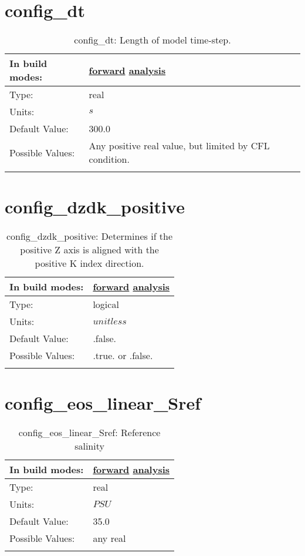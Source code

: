 \section[config\_dt]{config\_dt}
\label{sec:nm_sec_config_dt}
\begin{center}
\begin{longtable}{| p{2.0in} || p{4.0in} |}
    \hline
    In build modes: & \hyperref[subsec:forward_nm_tab_time_integration]{forward} \hyperref[subsec:analysis_nm_tab_time_integration]{analysis} \\
    \hline
    Type: & real \\
    \hline
    Units: & $s$ \\
    \hline
    Default Value: & 300.0 \\
    \hline
    Possible Values: & Any positive real value, but limited by CFL condition. \\
    \hline
    \caption{config\_dt: Length of model time-step.}
\end{longtable}
\end{center}
\section[config\_dzdk\_positive]{config\_dzdk\_positive}
\label{sec:nm_sec_config_dzdk_positive}
\begin{center}
\begin{longtable}{| p{2.0in} || p{4.0in} |}
    \hline
    In build modes: & \hyperref[subsec:forward_nm_tab_ALE_vertical_grid]{forward} \hyperref[subsec:analysis_nm_tab_ALE_vertical_grid]{analysis} \\
    \hline
    Type: & logical \\
    \hline
    Units: & $unitless$ \\
    \hline
    Default Value: & .false. \\
    \hline
    Possible Values: & .true. or .false. \\
    \hline
    \caption{config\_dzdk\_positive: Determines if the positive Z axis is aligned with the positive K index direction.}
\end{longtable}
\end{center}
\section[config\_eos\_linear\_Sref]{config\_eos\_linear\_Sref}
\label{sec:nm_sec_config_eos_linear_Sref}
\begin{center}
\begin{longtable}{| p{2.0in} || p{4.0in} |}
    \hline
    In build modes: & \hyperref[subsec:forward_nm_tab_eos_linear]{forward} \hyperref[subsec:analysis_nm_tab_eos_linear]{analysis} \\
    \hline
    Type: & real \\
    \hline
    Units: & $PSU$ \\
    \hline
    Default Value: & 35.0 \\
    \hline
    Possible Values: & any real \\
    \hline
    \caption{config\_eos\_linear\_Sref: Reference salinity}
\end{longtable}
\end{center}
